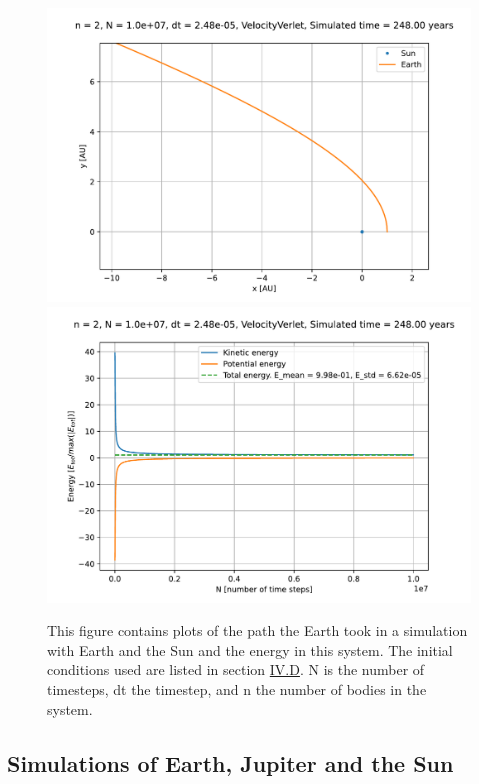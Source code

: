 \documentclass[reprint,english,notitlepage]{revtex4-1}  %
\begin{document}
\begin{figure}[H]
\includegraphics[width=\columnwidth]{../data/figures/escapevelocity/se_esc_9_orbit2D_zoomed.pdf}
\includegraphics[width=\columnwidth]{../data/figures/escapevelocity/se_esc_9_energy.pdf}
\caption{This figure contains plots of the path the Earth took in a simulation with Earth and the Sun and the energy in this system. The initial conditions used are listed in section \hyperref[sec:IV:d]{IV.D}. N is the number of timesteps, dt the timestep, and n the number of bodies in the system.}
\label{fig:escvel_9}
\end{figure}



\subsection{Simulations of Earth, Jupiter and the Sun} \label{sec:IV:e}
\end{document}
